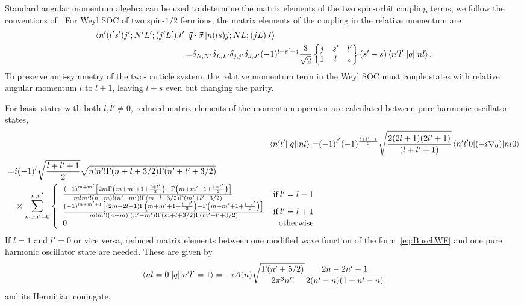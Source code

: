 Standard angular momentum algebra can be used to determine the matrix elements of the two spin-orbit coupling terms; we follow the conventions of \cite{Edmonds}. For Weyl SOC of two spin-$1/2$ fermions, the matrix elements of the coupling in the relative momentum are
\begin{equation}\label{eq:WeylRel}\begin{split}
\bra{n'(l's')j';N'L';(j'L')J'}\vec{q}&\cdot\vec{\sigma} \ket{n(ls)j;NL;(jL)J}  \\
=&\delta_{N,N'}\delta_{L,L'}\delta_{j,j'}\delta_{J,J'}(-1)^{l+s'+j}\frac{3}{\sqrt{2}}\begin{Bmatrix} j & s' & l' \\ 1 & l & s \end{Bmatrix} (s'-s)\braket{n'l' || q || n l}.
\end{split}
\end{equation}
To preserve anti-symmetry of the two-particle system, the relative momentum term in the Weyl SOC must couple states with relative angular momentum $l$ to $l\pm 1$, leaving $l+s$ even but changing the parity.

For basis states with both $l,l'\neq0$, reduced matrix elements of the momentum operator are calculated between pure harmonic oscillator states,
\begin{align}
\braket{n'l' || q || n l}=&(-1)^{l'}(-1)^{\frac{l+l'+1}{2}}\sqrt{\frac{2(2l+1)(2l'+1)}{(l+l'+1)}}\braket{n'l'0| (-i \nabla_0) | n l 0} \\
\begin{split} =& i(-1)^{l}\sqrt{\frac{l+l'+1}{2}}\sqrt{n!n'!\Gamma(n+l+3/2)\Gamma(n'+l'+3/2)} \\ 
&\times\sum_{m,m'=0}^{n,n'} \left\{
     \begin{array}{lr}
       \frac{(-1)^{m+m'}\left[2m\Gamma\left(m+m'+1+\frac{l+l'}{2}\right)-\Gamma\left(m+m'+1+\frac{l+l'}{2}\right)\right]}{m!m'!(n-m)!(n'-m')!\Gamma(m+l+3/2)\Gamma(m'+l'+3/2)} & \text{if}\: l'=l-1 \\
        \frac{(-1)^{m+m'+1}\left[(2m+2l+1)\Gamma\left(m+m'+1+\frac{l+l'}{2}\right)-\Gamma\left(m+m'+1+\frac{l+l'}{2}\right)\right]}{m!m'!(n-m)!(n'-m')!\Gamma(m+l+3/2)\Gamma(m'+l'+3/2)} & \text{if}\: l'=l+1 \\
       0 & \text{otherwise}
     \end{array}
   \right.
   \end{split}
\end{align}
If $l=1$ and $l'=0$ or vice versa, reduced matrix elements between one modified wave function of the form~\eqref{eq:BuschWF} and one pure harmonic oscillator state are needed. These are given by
\begin{align}
\braket{n l=0 || q || n' l'=1}=-i A(n) \sqrt{\frac{\Gamma(n'+5/2)}{2\pi^3 n'!}}\frac{2n-2n'-1}{2(n'-n)(1+n'-n)}
\end{align}
and its Hermitian conjugate.

